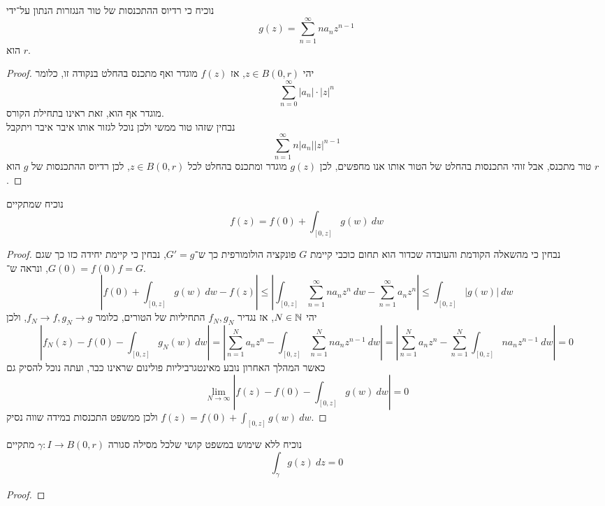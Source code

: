 \subquestion{}
נוכיח כי רדיוס ההתכנסות של טור הנגזרות הנתון על־ידי
\[
	g(z) = \sum_{n = 1}^{\infty} n a_n z^{n - 1}
\]
הוא $r$.
\begin{proof}
	יהי $z \in B(0, r)$, אז $f(z)$ מוגדר ואף מתכנס בהחלט בנקודה זו, כלומר
	\[
		\sum_{n = 0}^{\infty} |a_n| \cdot {|z|}^n
	\]
	מוגדר אף הוא, זאת ראינו בתחילת הקורס. \\
	נבחין שזהו טור ממשי ולכן נוכל לגזור אותו איבר איבר ויתקבל
	\[
		\sum_{n = 1}^{\infty} n |a_n| {|z|}^{n - 1}
	\]
	טור מתכנס, אבל זוהי התכנסות בהחלט של הטור אותו אנו מחפשים, לכן $g(z)$ מוגדר ומתכנס בהחלט לכל $z \in B(0, r)$, לכן רדיוס ההתכנסות של $g$ הוא $r$.
\end{proof}

\subquestion{}
נוכיח שמתקיים
\[
	f(z) = f(0) + \int_{[0, z]} g(w)\ dw
\]
\begin{proof}
	נבחין כי מהשאלה הקודמת והעובדה שכדור הוא תחום כוכבי קיימת $G$ פונקציה הולומורפית כך ש־$G' = g$, נבחין כי קיימת יחידה כזו כך שגם $G(0) = f(0)$, ונראה ש־$f = G$.
	\[
		\left\lvert f(0) + \int_{[0, z]} g(w)\ dw - f(z) \right\rvert
		\le \left\lvert \int_{[0, z]} \sum_{n = 1}^{\infty} n a_n z^n\ dw - \sum_{n = 1}^{\infty} a_n z^n \right\rvert
		\le \int_{[0, z]} |g(w)|\ dw
	\]
	יהי $N \in \mathbb{N}$, אז נגדיר $f_N, g_N$ התחיליות של הטורים, כלומר $f_N \to f, g_N \to g$, ולכן
	\[
		\left\lvert f_N(z) - f(0) - \int_{[0, z]} g_N(w)\ dw \right\rvert
		= \left\lvert \sum_{n = 1}^{N} a_n z^n - \int_{[0, z]} \sum_{n = 1}^{N} n a_n z^{n - 1}\ dw \right\rvert
		= \left\lvert \sum_{n = 1}^{N} a_n z^n - \sum_{n = 1}^{N} \int_{[0, z]} n a_n z^{n - 1}\ dw \right\rvert
		= 0
	\]
	כאשר המהלך האחרון נובע מאינטגרביליות פולינום שראינו כבר, ועתה נוכל להסיק גם
	\[
		\lim_{N \to \infty} |f(z) - f(0) - \int_{[0, z]} g(w)\ dw| = 0
	\]
	ולכן ממשפט התכנסות במידה שווה נסיק $f(z) = f(0) + \int_{[0, z]} g(w)\ dw$.
\end{proof}

\subquestion{}
נוכיח ללא שימוש במשפט קושי שלכל מסילה סגורה $\gamma : I \to B(0, r)$ מתקיים
\[
	\int_\gamma g(z)\ dz = 0
\]
\begin{proof}
	
\end{proof}


